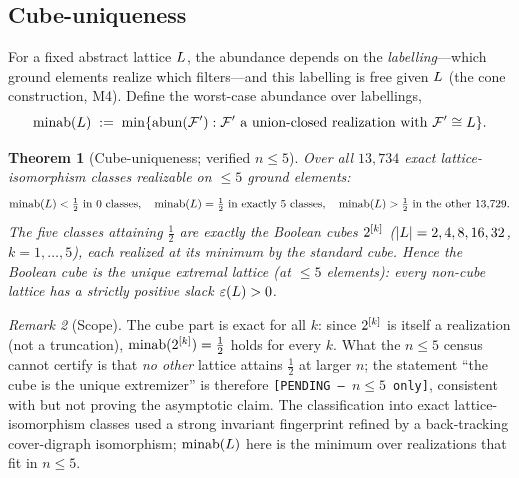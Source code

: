 \documentclass[11pt]{amsart}
\newtheorem{theorem}{Theorem}[section]
\theoremstyle{definition}
\theoremstyle{remark}
\newtheorem{remark}[theorem]{Remark}
\begin{document}
\subsection{Cube-uniqueness}\label{ssec:cube-unique}
For a fixed abstract lattice $L$, the abundance depends on the
\emph{labelling}---which ground elements realize which filters---and this labelling
is free given $L$ (the cone construction, M4). Define the worst-case abundance
over labellings,
\begin{equation}\label{eq:minab}
   \operatorname{minab}(L)\;:=\;\min\{\operatorname{abun}(\mathcal{F}'):\mathcal{F}'\text{ a union-closed realization with }
   \mathcal{F}'\cong L\}.
\end{equation}

\begin{theorem}[Cube-uniqueness; verified $n\le5$]\label{thm:cube-unique}
Over all $13{,}734$ exact lattice-isomorphism classes realizable on $\le 5$
ground elements:
\[
   \operatorname{minab}(L)<\tfrac12 \text{ in }0\text{ classes},\quad
   \operatorname{minab}(L)=\tfrac12 \text{ in exactly }5\text{ classes},\quad
   \operatorname{minab}(L)>\tfrac12 \text{ in the other }13{,}729 .
\]
The five classes attaining $\tfrac12$ are exactly the Boolean cubes
$2^{[k]}$ \textup($|L|=2,4,8,16,32$, $k=1,\dots,5$\textup), each realized at its
minimum by the standard cube. Hence the Boolean cube is the unique extremal lattice
\textup(at $\le 5$ elements\textup): every non-cube lattice has a strictly positive
slack $\varepsilon(L)>0$.
\end{theorem}

\begin{remark}[Scope]\label{rmk:cube-scope}
The cube part is exact for all $k$: since $2^{[k]}$ is itself a realization (not a
truncation), $\operatorname{minab}(2^{[k]})=\tfrac12$ holds for every $k$. What the $n\le 5$
census cannot certify is that \emph{no other} lattice attains $\tfrac12$ at larger
$n$; the statement ``the cube is the unique extremizer'' is therefore
\texttt{[PENDING --- $n\le 5$ only]}, consistent with but not proving the
asymptotic claim. The classification into exact lattice-isomorphism classes used a
strong invariant fingerprint refined by a back-tracking cover-digraph isomorphism;
$\operatorname{minab}(L)$ here is the minimum over realizations that fit in $n\le 5$.
\end{remark}
\end{document}
